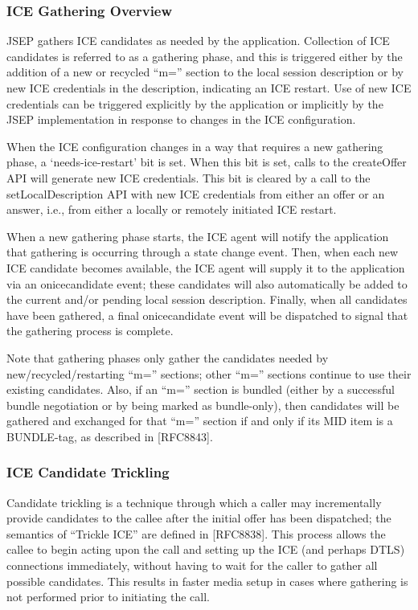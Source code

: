 \documentclass{article}
\begin{document}
\subsubsection{ICE Gathering Overview}

JSEP gathers ICE candidates as needed by the application.  Collection
of ICE candidates is referred to as a gathering phase, and this is
triggered either by the addition of a new or recycled ``m='' section to
the local session description or by new ICE credentials in the
description, indicating an ICE restart.  Use of new ICE credentials
can be triggered explicitly by the application or implicitly by the
JSEP implementation in response to changes in the ICE configuration.

When the ICE configuration changes in a way that requires a new
gathering phase, a `needs-ice-restart' bit is set.  When this bit is
set, calls to the createOffer API will generate new ICE credentials.
This bit is cleared by a call to the setLocalDescription API with new
ICE credentials from either an offer or an answer, i.e., from either
a locally or remotely initiated ICE restart.

When a new gathering phase starts, the ICE agent will notify the
application that gathering is occurring through a state change event.
Then, when each new ICE candidate becomes available, the ICE agent
will supply it to the application via an onicecandidate event; these
candidates will also automatically be added to the current and/or
pending local session description.  Finally, when all candidates have
been gathered, a final onicecandidate event will be dispatched to
signal that the gathering process is complete.

Note that gathering phases only gather the candidates needed by
new/recycled/restarting ``m='' sections; other ``m='' sections continue
to use their existing candidates.  Also, if an ``m='' section is
bundled (either by a successful bundle negotiation or by being marked
as bundle-only), then candidates will be gathered and exchanged for
that ``m='' section if and only if its MID item is a BUNDLE-tag, as
described in [RFC8843].

\subsubsection{ICE Candidate Trickling}

Candidate trickling is a technique through which a caller may
incrementally provide candidates to the callee after the initial
offer has been dispatched; the semantics of ``Trickle ICE'' are defined
in [RFC8838].  This process allows the callee to begin acting upon
the call and setting up the ICE (and perhaps DTLS) connections
immediately, without having to wait for the caller to gather all
possible candidates.  This results in faster media setup in cases
where gathering is not performed prior to initiating the call.
\end{document}
